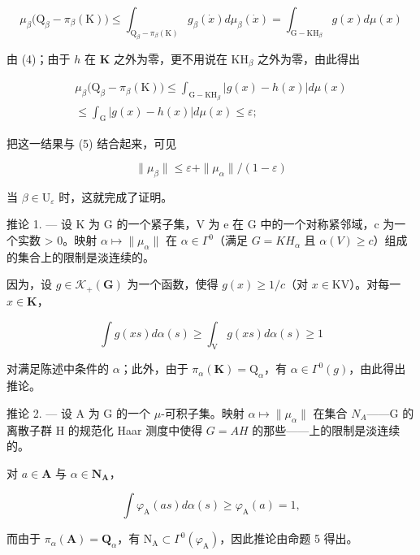 \[
\mu_ {\beta} \big (\mathrm{Q} _ {\beta} - \pi_ {\beta} (\mathrm{K}) \big) \leqslant \int_ {\mathrm{Q} _ {\beta} - \pi_ {\beta} (\mathrm{K})} g _ {\beta} (\dot {x}) d \mu_ {\beta} (\dot {x}) = \int_ {\mathrm{G} - \mathrm{KH} _ {\beta}} g (x) d \mu (x)
\]

由 (4)；由于 \(h\) 在 \(\mathbf{K}\) 之外为零，更不用说在 \(\mathrm{KH}_{\beta}\) 之外为零，由此得出

\[
\begin{array}{c} \mu_ {\beta} \big (\mathrm{Q} _ {\beta} - \pi_ {\beta} (\mathrm{K}) \big) \leqslant \int_ {\mathrm{G} - \mathrm{KH} _ {\beta}} | g (x) - h (x) | d \mu (x) \\ \leqslant \int_ {\mathrm{G}} | g (x) - h (x) | d \mu (x) \leqslant \varepsilon ; \end{array}
\]

把这一结果与 (5) 结合起来，可见

\[
\| \mu_ {\beta} \| \leqslant \varepsilon + \| \mu_ {\alpha} \| / (1 - \varepsilon)
\]

当 \(\beta \in \mathrm{U}_{\varepsilon}\) 时，这就完成了证明。

推论 1. --- 设 K 为 G 的一个紧子集，V 为 e 在 G 中的一个对称紧邻域，c 为一个实数 \textgreater{} 0。映射 \(\alpha \mapsto \|\mu_{\alpha}\|\) 在 \(\alpha \in \Gamma^0\)（满足 \(G = KH_{\alpha}\) 且 \(\alpha(V) \geqslant c\)）组成的集合上的限制是淡连续的。

因为，设 \(g \in \mathcal{K}_{+}(\mathbf{G})\) 为一个函数，使得 \(g(x) \geqslant 1 / c\)（对 \(x \in \mathrm{KV}\)）。对每一 \(x \in \mathbf{K}\)，

\[
\int g (x s) d \alpha (s) \geqslant \int_ {\mathrm{V}} g (x s) d \alpha (s) \geqslant 1
\]

对满足陈述中条件的 \(\alpha\)；此外，由于 \(\pi_{\alpha}(\mathbf{K}) = \mathrm{Q}_{\alpha}\)，有 \(\alpha \in \Gamma^0(g)\)，由此得出推论。

推论 2. --- 设 A 为 G 的一个 \(\mu\)-可积子集。映射 \(\alpha \mapsto \|\mu_{\alpha}\|\) 在集合 \(N_A\)——G 的离散子群 H 的规范化 Haar 测度中使得 \(G = AH\) 的那些——上的限制是淡连续的。

对 \(a \in \mathbf{A}\) 与 \(\alpha \in \mathbf{N}_{\mathbf{A}}\)，

\[
\int \varphi_ {\mathrm{A}} (a s) d \alpha (s) \geqslant \varphi_ {\mathrm{A}} (a) = 1,
\]

而由于 \(\pi_{\alpha}(\mathbf{A}) = \mathbf{Q}_{\alpha}\)，有 \(\mathrm{N}_{\mathrm{A}} \subset \Gamma^{0}(\varphi_{\mathrm{A}})\)，因此推论由命题 5 得出。

